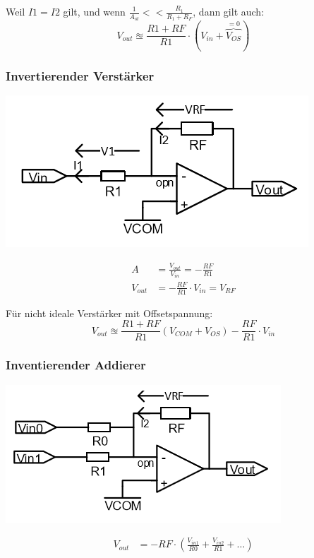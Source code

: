 Weil $I1 = I2$ gilt, und wenn $\frac{1}{A_{ol}} << \frac{R_1}{R_1 + R_F}$, dann gilt auch:
\[ V_{out} \approxeq \frac{R1 + RF}{R1} \cdot (V_{in} + \overbrace{V_{OS}}^{= 0})\]

\subsubsection{Invertierender Verstärker}
\begin{minipage}{0.25\textwidth}
	\includegraphics[width=\linewidth,keepaspectratio=true]{./Images/opamp_invertierendpng}
\end{minipage}%
\begin{minipage}{0.25\textwidth}
	\begin{align*}
		A &= \frac{V_{out}}{V_{in}} = -\frac{RF}{R1} \\
		V_{out} &= -\frac{RF}{R1} \cdot V_{in} = V_{RF}
	\end{align*}
\end{minipage}
Für nicht ideale Verstärker mit Offsetspannung:
\[
	V_{out} \approxeq \frac{R1 + RF}{R1}(V_{COM} + V_{OS}) - \frac{RF}{R1} \cdot V_{in}
\]


\subsubsection{Inventierender Addierer}
\begin{minipage}{0.20\textwidth}
	\includegraphics[width=\linewidth,keepaspectratio=true]{./Images/opamp_summierend}
\end{minipage}%
\begin{minipage}{0.30\textwidth}
	\begin{align*}
		V_{out} &= -RF\cdot \left(\frac{V_{in1}}{R0} + \frac{V_{in2}}{R1} + \dots \right)
	\end{align*}
\end{minipage}

